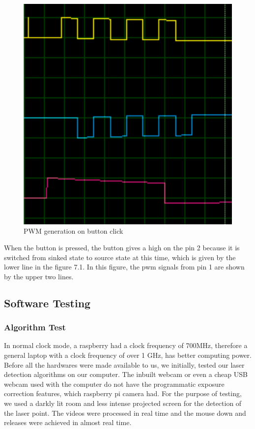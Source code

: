 \documentclass[12pt, a4paper]{article}
\begin{document}
\begin{figure}[htp]
\centering
\includegraphics[scale=0.30]{afterpress.png}
\caption{PWM generation on button click}
\label{}
\end{figure}

When the button is pressed, the button gives a high on the pin 2 because it is switched from sinked state to source state at this time, which is given by the lower line in the figure 7.1. In this figure, the pwm signals from pin 1 are shown by the upper two lines.

 

\subsection{Software Testing}
\subsubsection{Algorithm Test}
In normal clock mode, a raspberry had a clock frequency of 700MHz, therefore a general laptop with a clock frequency of over 1 GHz, has better computing power. Before all the hardwares were made available to us, we initially, tested our laser detection algorithms on our computer. The inbuilt webcam or even a cheap USB webcam used with the computer do not have the programmatic exposure correction features, which raspberry pi camera had. For the purpose of testing, we used a darkly lit room and less intense projected screen for the detection of the laser point. The videos were processed in real time and the mouse down and releases were achieved in almost real time. 
\end{document}
